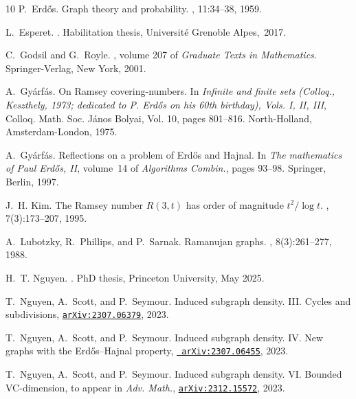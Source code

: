 \documentclass[11pt,reqno]{amsart}
\begin{document}
\begin{thebibliography}{10}
		P.~Erd{\H o}s.
		\newblock Graph theory and probability.
		, 11:34--38, 1959.
		
		L.~Esperet.
		.
		\newblock Habilitation thesis, Universit\'e Grenoble Alpes,~2017.
		
		C.~Godsil and G.~Royle.
		, volume 207 of {\em Graduate Texts in
			Mathematics}.
		\newblock Springer-Verlag, New York, 2001.
		
		A.~Gy\'{a}rf\'{a}s.
		\newblock On {R}amsey covering-numbers.
		\newblock In {\em Infinite and finite sets ({C}olloq., {K}eszthely, 1973;
			dedicated to {P}. {E}rd\H{o}s on his 60th birthday), {V}ols. {I}, {II},
			{III}}, Colloq. Math. Soc. J\'{a}nos Bolyai, Vol. 10, pages 801--816.
		North-Holland, Amsterdam-London, 1975.
		
		A.~Gy{\'a}rf{\'a}s.
		\newblock Reflections on a problem of {E}rd{\H o}s and {H}ajnal.
		\newblock In {\em The mathematics of {P}aul {E}rd{\H o}s, {II}}, volume~14 of
		{\em Algorithms Combin.}, pages 93--98. Springer, Berlin, 1997.
		
		J.~H. Kim.
		\newblock The {R}amsey number {$R(3,t)$} has order of magnitude {$t^2/\log t$}.
		, 7(3):173--207, 1995.
		
		A.~Lubotzky, R.~Phillips, and P.~Sarnak.
		\newblock Ramanujan graphs.
		, 8(3):261--277, 1988.
		
		H.~T. Nguyen.
		.
		\newblock PhD thesis, Princeton University, May 2025.
		
		T.~Nguyen, A.~Scott, and P.~Seymour.
		\newblock Induced subgraph density. III. Cycles and subdivisions,
		\href{https://arxiv.org/abs/2307.06379}{\tt arXiv:2307.06379}, 2023.
		
		T.~Nguyen, A.~Scott, and P.~Seymour.
		\newblock Induced subgraph density. IV. New graphs with the Erd{\H
			o}s--{H}ajnal property, \href{https://arxiv.org/abs/2307.06455}{\tt
			arXiv:2307.06455}, 2023.
		
		T.~Nguyen, A.~Scott, and P.~Seymour.
		\newblock Induced subgraph density. VI. Bounded VC-dimension, to appear in {\em
			Adv. Math.}, \href{https://arxiv.org/abs/2312.15572}{\tt arXiv:2312.15572},
		2023.
		

\end{thebibliography}
\end{document}
